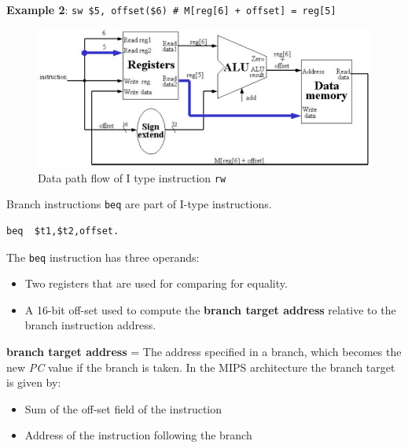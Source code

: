 \documentclass[10pt,a4paper]{article}
\begin{document}
\pagebreak
\textbf{Example 2}: \texttt{sw \$5, offset(\$6) \# M[reg[6] + offset] = reg[5]}
\begin{figure} [h!]
    \centering
    \includegraphics[scale=0.8]{I type example 2.JPG}
    \caption{Data path flow of I type instruction \texttt{rw}}
\end{figure}

Branch instructions \texttt{beq} are part of I-type instructions.
\begin{lstlisting}[numbers=none]
    beq  $t1,$t2,offset.
\end{lstlisting}
The \texttt{beq} instruction has three operands: 
\begin{itemize}
    \item Two registers that are used for comparing for equality.
    \item A 16-bit off-set used to compute the \textbf{branch target address} relative to the branch
    instruction address.
\end{itemize}

\begin{tcolorbox}[breakable,colback=white]
    \textbf{branch target address} = The address specified in a branch, which becomes the new
    \textit{PC} value if the branch is taken. In the MIPS architecture the branch target is given by: 
    \begin{itemize}
        \item Sum of the off-set field of the instruction
        \item Address of the instruction following the branch
    \end{itemize}
\end{tcolorbox}
\end{document}
